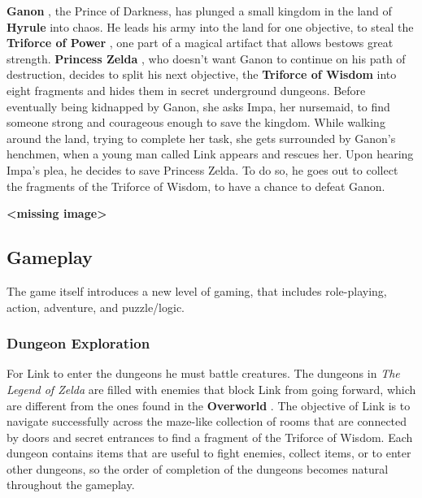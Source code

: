 \documentclass[a4paper,10pt]{book}
\begin{document}
 \textbf{Ganon } , the Prince of Darkness, has plunged a small kingdom in the 
              land of  \textbf{Hyrule }  into chaos. He leads his army into the land for one 
              objective, to steal the  \textbf{Triforce of Power } , one part of a magical
              artifact that allows bestows great strength.  \textbf{Princess Zelda } , who 
              doesn't want Ganon to continue on his path of destruction, decides to 
              split his next objective, the  \textbf{Triforce of Wisdom }  into eight fragments
              and hides them in secret underground dungeons. Before eventually being 
              kidnapped by Ganon, she asks Impa, her nursemaid, to find someone strong 
              and courageous enough to save the kingdom. While walking around the land,
              trying to complete her task, she gets surrounded by Ganon's henchmen, when 
              a young man called Link appears and rescues her. Upon hearing Impa's plea,
              he decides to save Princess Zelda. To do so, he goes out to collect the fragments
              of the Triforce of Wisdom, to have a chance to defeat Ganon.
               
 
 
 \textbf{<missing image>}
 
 \subsection{Gameplay }
 The game itself introduces a new level of gaming, that
          includes role-playing, action, adventure, and puzzle/logic. 
 \subsubsection{Dungeon Exploration }
 
          For Link to enter the dungeons he must battle creatures.
          The dungeons in  \textit{The Legend of Zelda } are filled with enemies that block
          Link from going forward, which are different from the ones found in the
           \textbf{Overworld } . The objective of Link is to navigate successfully across the
          maze-like collection of rooms that are connected by doors and secret entrances
          to find a fragment of the Triforce of Wisdom. Each dungeon contains
          items that are useful to fight enemies, collect items, or to enter other
          dungeons, so the order of completion of the dungeons becomes natural throughout
          the gameplay.
           
\end{document}
